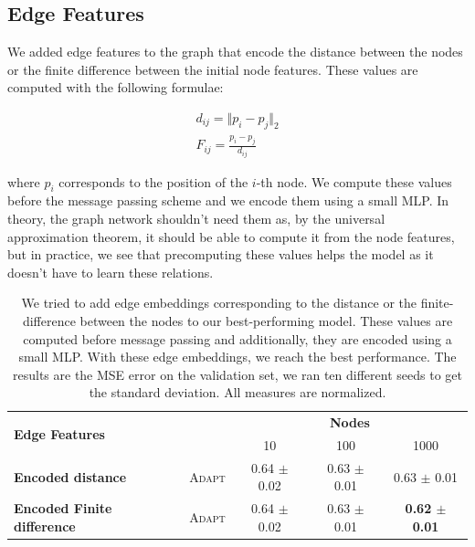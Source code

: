 \documentclass[a4paper,10pt]{article}
\begin{document}
\subsection{Edge Features}
We added edge features to the graph that encode the distance between the nodes or the finite difference between the initial node features. These values are computed with the following formulae:

\begin{align}
  d_{ij} = \Vert p_{i} - p_{j} \Vert_{2} \\
  F_{ij} = \frac{p_{i} - p_{j}}{d_{ij}}
\end{align}

where $p_{i}$ corresponds to the position of the $i$-th node. We compute these values before the message passing scheme and we encode them using a small MLP. In theory, the graph network shouldn't need them as, by the universal approximation theorem, it should be able to compute it from the node features, but in practice, we see that precomputing these values helps the model as it doesn't have to learn these relations.

\begin{table}
  \label{tab:nodes}
  \centering
  \begin{tabular}{lcccc} \toprule
    \multirow{2}{*}{\textbf{Edge Features}} &                            & \multicolumn{3}{c}{\textbf{Nodes}}                                                          \\ \cmidrule(lr){3-5}
                                            &                            & 10                                 & 100                   & 1000                           \\ \hline
    \textbf{Encoded distance}               & \scriptsize \textsc{Adapt} & 0.64 \tiny $\pm$ 0.02              & 0.63 \tiny $\pm$ 0.01 & 0.63 \tiny $\pm$ 0.01          \\
    \textbf{Encoded Finite difference}      & \scriptsize \textsc{Adapt} & 0.64 \tiny $\pm$ 0.02              & 0.63 \tiny $\pm$ 0.01 & \textbf{0.62 \tiny $\pm$ 0.01} \\
    \bottomrule
  \end{tabular}
  \caption{
    We tried to add edge embeddings corresponding to the distance or the finite-difference between the nodes to our best-performing model. These values are computed before message passing and additionally, they are encoded using a small MLP. With these edge embeddings, we reach the best performance. The results are the MSE error on the validation set, we ran ten different seeds to get the standard deviation. All measures are normalized.
  }
\end{table}
\end{document}
